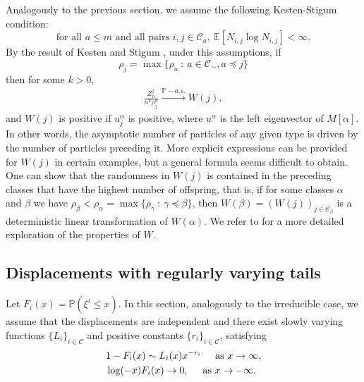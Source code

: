 \documentclass[12pt]{article}
\numberwithin{equation}{section}
\begin{document}
    Analogously to the previous section, we assume the following Kesten-Stigum condition: \begin{equation}\label{as6}
       \text{for all } a \leq m\text{ and all pairs } i,j \in \mathcal{C}_a,   \   \mathbb{E}[N_{i,j} \log N_{i,j}] < \infty.
   \end{equation}
   By the result of Kesten and Stigum \cite{kesten2}, under this assumptions, if \[\rho_j = \max{\{\rho_a \ : \ a \in \mathcal{C}_{\sim}, a \preceq j}\}\] then for some $k>0$,
   \begin{align}\label{kestenr}
   \frac {Z^j_n} {n^k\rho_j^n} \xrightarrow{\mathbb{P}-a.s.} W(j), 
   \end{align}
   and $W(j)$ is positive if $u^\alpha_j$ is positive, where $u^\alpha$ is the left eigenvector of $M[\alpha]$. In other words, the asymptotic number of particles of any given type is driven by the number of particles preceding it. More explicit expressions can be provided for $W(j)$ in certain examples, but a general formula seems difficult to obtain. One can show that the randomness in $W(j)$ is contained in the preceding classes that have the highest number of offspring, that is, if for some classes $\alpha$ and $\beta$ we have $\rho_\beta  < \rho_\alpha = \max{\{\rho_\gamma \ : \ \gamma \preceq \beta}\}$, then $W(\beta) = (W(j))_{j \in \mathcal{C}_\beta}$ is a deterministic linear transformation of $W(\alpha)$. We refer to \cite{kesten2} for a more detailed exploration of the properties of $W$. 

\subsection{Displacements with regularly varying tails}
Let $F_i(x) = \mathbb{P}\left(\xi^i \leq x\right)$. In this section, analogously to the irreducible case, we assume that the displacements are independent and there exist slowly varying functions $\{L_i\}_{i \in \mathcal{C}}$ and positive constants $\{r_i\}_{i \in \mathcal{C}}$, satisfying
\begin{align}\label{t3:tails}
\begin{aligned}
     &1-F_i(x) \sim L_i(x) x^{-r_i} \hspace{0.5cm} \text{as }x \rightarrow \infty, \\
     &\log(-x)F_i(x)\rightarrow 0 , \hspace{0.5cm}  \text{as }x \rightarrow -\infty.
\end{aligned}
\end{align}
\end{document}
